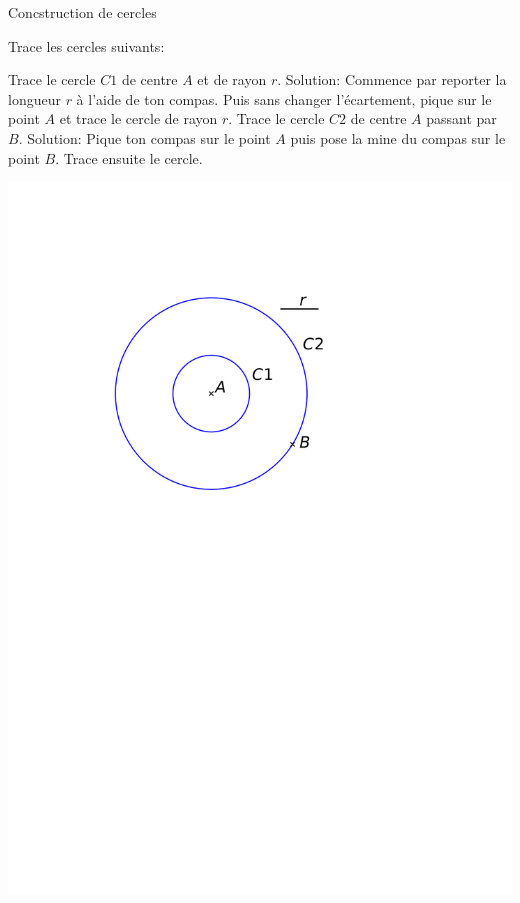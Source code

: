 \documentclass[a4paper,11pt]{report}
\begin{document}
\begin{resolu}{Concstruction de cercles}{
\begin{minipage}[t]{0.6\textwidth}{
\vspace{0pt}
Trace les cercles suivants:
\begin{tasks}[after-item-skip = 0.4em]
    \task Trace le cercle $C1$ de centre $A$ et de rayon $r$.
    \task[]Solution: Commence par reporter la longueur $r$ à l'aide de ton compas. Puis sans changer l'écartement, pique sur le point $A$ et trace le cercle de rayon $r$. 
    \task Trace le cercle $C2$ de centre $A$ passant par $B$.
    \task[]Solution: Pique ton compas sur le point $A$ puis pose la mine du compas sur le point $B$. Trace ensuite le cercle. 
\end{tasks}
}
\end{minipage}
\begin{minipage}[t]{0.4\textwidth}{
\vspace{0pt}
\begin{center}	
\includegraphics[scale=0.6]{media/es-10/12-1-b}
\end{center}
}

\end{minipage}}
\end{resolu}
\end{document}

